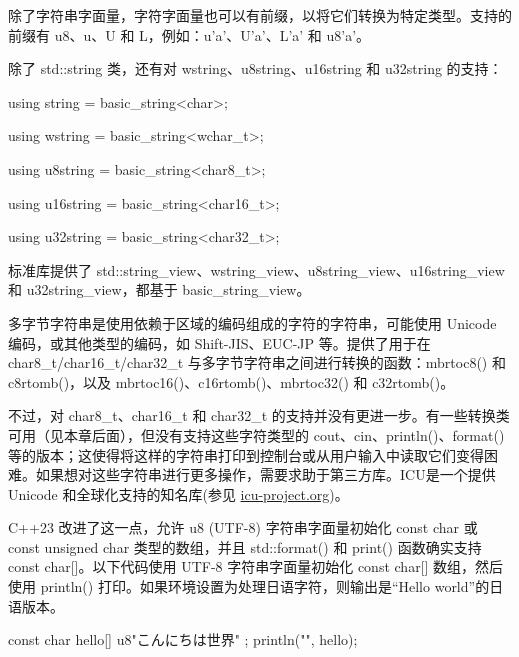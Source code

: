 除了字符串字面量，字符字面量也可以有前缀，以将它们转换为特定类型。支持的前缀有 u8、u、U 和 L，例如：u'a'、U'a'、L'a' 和 u8'a'。

除了 std::string 类，还有对 wstring、u8string、u16string 和 u32string 的支持：

\begin{cpp}
using string = basic_string<char>;
\end{cpp}

\begin{cpp}
using wstring = basic_string<wchar_t>;
\end{cpp}

\begin{cpp}
using u8string = basic_string<char8_t>;
\end{cpp}

\begin{cpp}
using u16string = basic_string<char16_t>;
\end{cpp}

\begin{cpp}
using u32string = basic_string<char32_t>;
\end{cpp}

标准库提供了 std::string\_view、wstring\_view、u8string\_view、u16string\_view 和 u32string\_view，都基于 basic\_string\_view。

多字节字符串是使用依赖于区域的编码组成的字符的字符串，可能使用 Unicode 编码，或其他类型的编码，如 Shift-JIS、EUC-JP 等。提供了用于在 char8\_t/char16\_t/char32\_t 与多字节字符串之间进行转换的函数：mbrtoc8() 和 c8rtomb()，以及 mbrtoc16()、c16rtomb()、mbrtoc32() 和 c32rtomb()。

不过，对 char8\_t、char16\_t 和 char32\_t 的支持并没有更进一步。有一些转换类可用（见本章后面），但没有支持这些字符类型的 cout、cin、println()、format() 等的版本；这使得将这样的字符串打印到控制台或从用户输入中读取它们变得困难。如果想对这些字符串进行更多操作，需要求助于第三方库。ICU是一个提供 Unicode 和全球化支持的知名库(参见 \url{icu-project.org})。


C++23 改进了这一点，允许 u8 (UTF-8) 字符串字面量初始化 const char 或 const unsigned char 类型的数组，并且 std::format() 和 print() 函数确实支持 const char[]。以下代码使用 UTF-8 字符串字面量初始化 const char[] 数组，然后使用 println() 打印。如果环境设置为处理日语字符，则输出是“Hello world”的日语版本。

\begin{cpp}
const char hello[] { u8"こんにちは世界" };
println("{}", hello);
\end{cpp}

